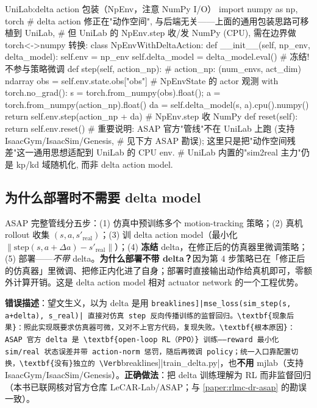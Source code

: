 \begin{codebox}[Python]{UniLab:delta action 包装（NpEnv，注意 NumPy I/O）}
import numpy as np, torch
# delta action 修正在"动作空间", 与后端无关——上面的通用包装思路可移植到 UniLab,
# 但 UniLab 的 NpEnv.step 收/发 NumPy (CPU), 需在边界做 torch<->numpy 转换:
class NpEnvWithDeltaAction:
    def __init__(self, np_env, delta_model):
        self.env = np_env
        self.delta_model = delta_model.eval()      # 冻结! 不参与策略微调
    def step(self, action_np):                     # action_np: (num_envs, act_dim) ndarray
        obs = self.env.state.obs["obs"]            # NpEnvState 的 actor 观测
        with torch.no_grad():
            s = torch.from_numpy(obs).float(); a = torch.from_numpy(action_np).float()
            da = self.delta_model(s, a).cpu().numpy()
        return self.env.step(action_np + da)       # NpEnv.step 收 NumPy
    def reset(self): return self.env.reset()
# 重要说明: ASAP 官方"管线"不在 UniLab 上跑 (支持 IsaacGym/IsaacSim/Genesis,
# 见下方 ASAP 勘误); 这里只是把"动作空间残差"这一通用思想适配到 UniLab 的 CPU env.
# UniLab 内置的"sim2real 主力"仍是 kp/kd 域随机化, 而非 delta action model.
\end{codebox}

\subsection{为什么部署时不需要 delta model}
\label{sec:rlmc-act-delta-deploy}

ASAP 完整管线分五步：(1) 仿真中预训练多个 motion-tracking 策略；(2) 真机 rollout 收集 $(s,a,s'_{\text{real}})$；(3) 训 delta action model（最小化 $\|\text{step}(s,a+\Delta a)-s'_{\text{real}}\|$）；(4) \textbf{冻结} delta，在修正后的仿真器里微调策略；(5) 部署——\emph{不带} delta。\textbf{为什么部署不带 delta？}因为第 4 步策略已在「修正后的仿真器」里微调、把修正内化进了自身；部署时直接输出动作给真机即可，零额外计算开销。这是 delta action model 相对 actuator network 的一个工程优势。

\begin{pitfall}
\textbf{错误描述}：望文生义，以为 delta 是用 \Verb[breaklines]|mse_loss(sim_step(s, a+delta), s_real)| 直接对仿真 step 反向传播训练的监督回归。\textbf{现象后果}：照此实现既要求仿真器可微，又对不上官方代码，复现失败。\textbf{根本原因}：ASAP 官方 delta 是 \textbf{open-loop RL（PPO）} 训练——reward 最小化 sim/real 状态误差并带 action-norm 惩罚，随后再微调 policy；统一入口靠配置切换，\textbf{没有}独立的 \Verb[breaklines]|train_delta.py|，也\textbf{不用} mjlab（支持 IsaacGym/IsaacSim/Genesis）。\textbf{正确做法}：把 delta 训练理解为 RL 而非监督回归（本书已联网核对官方仓库 LeCAR-Lab/ASAP；与 \cref{paper:rlmc-dr-asap} 的勘误一致）。
\end{pitfall}

